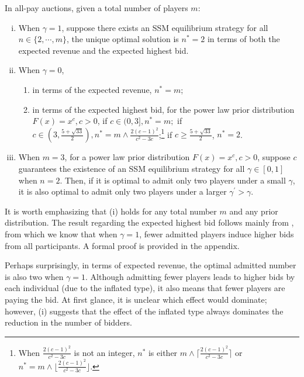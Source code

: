 \begin{theorem}
\label{thm:opt_admittednumber_allpay}
In all-pay auctions, given a total number of players $m$:
\begin{enumerate}[(i)]
\item When $\gamma=1$, suppose there exists an SSM equilibrium strategy for all $n\in \{2,\cdots,m\}$, the unique optimal solution is $n^\ast=2$ in terms of both the expected revenue and the expected highest bid.

\item When $\gamma=0$, 
\begin{enumerate}
    \item in terms of the expected revenue, $n^\ast=m$;
    \item in terms of the expected highest bid,
    for the power law prior distribution $F(x)=x^c,c>0$,
    if $c\in (0,3], n^\ast=m;$ if $c\in \left(3,\frac{5+\sqrt{33}}{2}\right), n^\ast=m \wedge \frac{2(c-1)^2}{c^2-3c}$;\footnote{When $\frac{2(c-1)^2}{c^2-3c}$ is not an integer, $n^\ast$ is either $m \wedge \bigg\lceil{\frac{2(c-1)^2}{c^2-3c}}\bigg\rceil$ or $n^* = m \wedge \bigg\lfloor{\frac{2(c-1)^2}{c^2-3c}}\bigg\rfloor$.} if $c\geq\frac{5+\sqrt{33}}{2}$, $n^\ast=2$.
\end{enumerate}

\item When $m=3$, for a power law prior distribution $F(x)=x^c,c>0$, suppose $c$ guarantees the existence of an SSM equilibrium strategy for all $\gamma\in[0,1]$ when $n=2$. Then, 
if it is optimal to admit only two players under a small $\gamma$, it is also optimal to admit only two players under a larger $\gamma^\prime>\gamma$.
\end{enumerate}
\end{theorem}



It is worth emphasizing that  (i) holds for any total number $m$ and any prior distribution. The result regarding the expected highest bid follows mainly from , from which we know that when $\gamma=1$, fewer admitted players induce higher bids from all participants. A formal proof is provided in the appendix.

Perhaps surprisingly, in terms of expected revenue, the optimal admitted number is also two when $\gamma=1$. Although admitting fewer players leads to higher bids by each individual (due to the inflated type), it also means that fewer players are paying the bid. At first glance, it is unclear which effect would dominate; however,  (i) suggests that the effect of the inflated type always dominates the reduction in the number of bidders.

